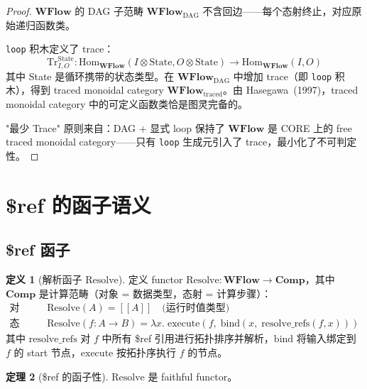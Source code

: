 \documentclass[11pt,a4paper]{article}
\theoremstyle{definition}
\newtheorem{theorem}{定理}[section]
\theoremstyle{definition}
\newtheorem{definition}[theorem]{定义}
\theoremstyle{remark}
\newcommand{\cat}[1]{\mathbf{#1}}
\newcommand{\catWFlow}{\cat{WFlow}}
\newcommand{\catComp}{\cat{Comp}}
\newcommand{\homset}[3]{\mathrm{Hom}_{#1}(#2, #3)}
\newcommand{\functor}[3]{#1: #2 \to #3}
\newcommand{\tensor}{\otimes}
\newcommand{\llbracket}{[\![}
\newcommand{\rrbracket}{]\!]}
\begin{document}
\begin{proof}
$\catWFlow$ 的 DAG 子范畴 $\catWFlow_{\mathrm{DAG}}$ 不含回边——每个态射终止，对应原始递归函数类。

\texttt{loop} 积木定义了 trace：
\[
\mathrm{Tr}^{\mathrm{State}}_{I,O}: \homset{\catWFlow}{I\tensor\mathrm{State}}{O\tensor\mathrm{State}} \to \homset{\catWFlow}{I}{O}
\]
其中 State 是循环携带的状态类型。在 $\catWFlow_{\mathrm{DAG}}$ 中增加 trace（即 \texttt{loop} 积木），得到 traced monoidal category $\catWFlow_{\mathrm{traced}}$。由 Hasegawa~(1997)，traced monoidal category 中的可定义函数类恰是图灵完备的。

"最少 Trace" 原则来自：DAG + 显式 loop 保持了 $\catWFlow$ 是 CORE 上的 free traced monoidal category——只有 \texttt{loop} 生成元引入了 trace，最小化了不可判定性。
\end{proof}

\section{\$ref 的函子语义}

\subsection{\$ref 函子}

\begin{definition}[解析函子 $\mathrm{Resolve}$]
定义 functor $\functor{\mathrm{Resolve}}{\catWFlow}{\catComp}$，其中 $\catComp$ 是计算范畴（对象 = 数据类型，态射 = 计算步骤）：
\[
\begin{aligned}
\text{对象映射:}&\quad \mathrm{Resolve}(A) = \llbracket A \rrbracket \quad\text{(运行时值类型)} \\
\text{态射映射:}&\quad \mathrm{Resolve}(f: A \to B) = \lambda x.\; \mathrm{execute}(f,\; \mathrm{bind}(x,\; \mathrm{resolve\_refs}(f, x)))
\end{aligned}
\]
其中 $\mathrm{resolve\_refs}$ 对 $f$ 中所有 \$ref 引用进行拓扑排序并解析，$\mathrm{bind}$ 将输入绑定到 $f$ 的 start 节点，$\mathrm{execute}$ 按拓扑序执行 $f$ 的节点。
\end{definition}

\begin{theorem}[\$ref 的函子性]
$\mathrm{Resolve}$ 是 faithful functor。
\label{thm:resolve-functor}
\end{theorem}
\end{document}

